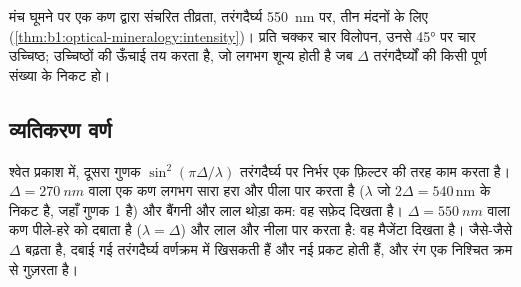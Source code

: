 \begin{omfigure}

{\small मंच घूमने पर एक कण द्वारा संचरित तीव्रता, तरंगदैर्घ्य \qty{550}{nm} पर, तीन मंदनों के लिए
(\cref{thm:b1:optical-mineralogy:intensity})। प्रति चक्कर चार विलोपन, उनसे \ang{45} पर चार उच्चिष्ठ;  उच्चिष्ठों की
ऊँचाई तय करता है, जो लगभग शून्य होती है जब $\Delta$ तरंगदैर्घ्यों की किसी पूर्ण संख्या के निकट हो।}
\end{omfigure}

\subsection{व्यतिकरण वर्ण}

श्वेत प्रकाश में, दूसरा गुणक $\sin^2(\pi\Delta/\lambda)$ तरंगदैर्घ्य पर निर्भर एक फ़िल्टर की तरह काम करता है। $\Delta = \qty{270}{nm}$
वाला एक कण लगभग सारा हरा और पीला पार करता है ($\lambda$ जो $2\Delta = 540$\,nm के निकट है, जहाँ गुणक 1 है) और बैंगनी और
लाल थोड़ा कम: वह सफ़ेद दिखता है। $\Delta = \qty{550}{nm}$ वाला कण पीले-हरे को दबाता है ($\lambda = \Delta$) और लाल और नीला
पार करता है: वह मैजेंटा दिखता है। जैसे-जैसे $\Delta$ बढ़ता है, दबाई गई तरंगदैर्घ्य वर्णक्रम में खिसकती हैं और नई प्रकट होती हैं,
और रंग एक निश्चित क्रम से गुज़रता है।

